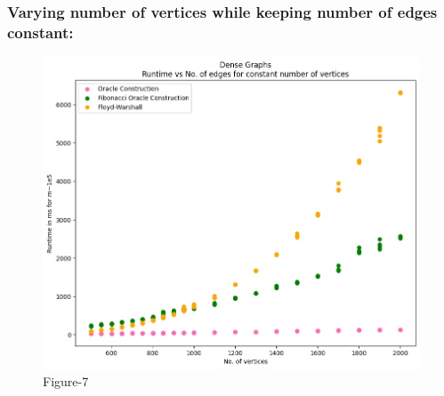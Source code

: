 \documentclass[12pt, a4paper]{article}
\begin{document}
    \subsubsection{Varying number of vertices while keeping number of edges constant:}
        \begin{figure}[H]
    \caption*{Figure-7}

    \centering
    \includegraphics[scale=0.6]{./images/7}
    \end{figure} 
    
\end{document}
